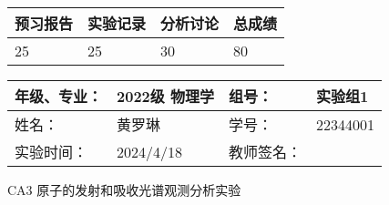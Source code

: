 \documentclass[dvipsnames, svgnames,a4paper,11pt]{article}
\begin{document}
	
	\begin{table}
		\renewcommand\arraystretch{1.7}
		\begin{tabularx}{\textwidth}{
				|X|X|X|X
				|X|X|X|X|}
			\hline
			\multicolumn{2}{|c|}{预习报告}&\multicolumn{2}{|c|}{实验记录}&\multicolumn{2}{|c|}{分析讨论}&\multicolumn{2}{|c|}{总成绩}\\
			\hline
			\LARGE25 & & \LARGE25 & & \LARGE30 & & \LARGE80 & \\
			\hline
		\end{tabularx}
	\end{table}
	
	\begin{table}
		\renewcommand\arraystretch{1.7}
		\begin{tabularx}{\textwidth}{|X|X|X|X|}
			\hline
			年级、专业： & 2022级 物理学 &组号： &实验组1 \\
			\hline
			姓名： &   黄罗琳 & 学号： &  22344001 \\
			\hline
			实验时间： & 2024/4/18 & 教师签名： & \\
			\hline
		\end{tabularx}
	\end{table}
	
	\begin{center}
		\LARGE CA3 \quad 原子的发射和吸收光谱观测分析实验
	\end{center}
	
\end{document}
